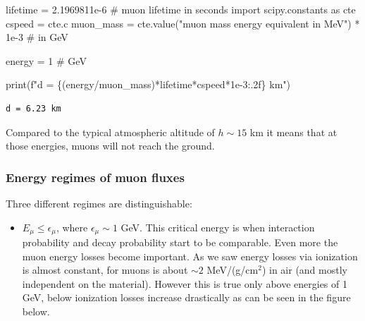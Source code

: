 \documentclass[
  letterpaper,
  DIV=11,
  numbers=noendperiod]{scrreprt}
\newenvironment{Shaded}{\begin{snugshade}}{\end{snugshade}}
\newcommand{\BuiltInTok}[1]{\textcolor[rgb]{0.00,0.23,0.31}{#1}}
\newcommand{\CommentTok}[1]{\textcolor[rgb]{0.37,0.37,0.37}{#1}}
\newcommand{\DecValTok}[1]{\textcolor[rgb]{0.68,0.00,0.00}{#1}}
\newcommand{\FloatTok}[1]{\textcolor[rgb]{0.68,0.00,0.00}{#1}}
\newcommand{\ImportTok}[1]{\textcolor[rgb]{0.00,0.46,0.62}{#1}}
\newcommand{\NormalTok}[1]{\textcolor[rgb]{0.00,0.23,0.31}{#1}}
\newcommand{\OperatorTok}[1]{\textcolor[rgb]{0.37,0.37,0.37}{#1}}
\newcommand{\SpecialCharTok}[1]{\textcolor[rgb]{0.37,0.37,0.37}{#1}}
\newcommand{\SpecialStringTok}[1]{\textcolor[rgb]{0.13,0.47,0.30}{#1}}
\newcommand{\StringTok}[1]{\textcolor[rgb]{0.13,0.47,0.30}{#1}}
\providecommand{\tightlist}{%
  \setlength{\itemsep}{0pt}\setlength{\parskip}{0pt}}\usepackage{longtable,booktabs,array}
\begin{document}
\begin{Shaded}
\begin{Highlighting}[]
\NormalTok{lifetime }\OperatorTok{=} \FloatTok{2.1969811e{-}6} \CommentTok{\# muon lifetime in seconds}
\ImportTok{import}\NormalTok{ scipy.constants }\ImportTok{as}\NormalTok{ cte}
\NormalTok{cspeed }\OperatorTok{=}\NormalTok{ cte.c}
\NormalTok{muon\_mass }\OperatorTok{=}\NormalTok{ cte.value(}\StringTok{"muon mass energy equivalent in MeV"}\NormalTok{) }\OperatorTok{*} \FloatTok{1e{-}3} \CommentTok{\# in GeV}

\NormalTok{energy }\OperatorTok{=} \DecValTok{1} \CommentTok{\# GeV}

\BuiltInTok{print}\NormalTok{(}\SpecialStringTok{f"d = }\SpecialCharTok{\{}\NormalTok{(energy}\OperatorTok{/}\NormalTok{muon\_mass)}\OperatorTok{*}\NormalTok{lifetime}\OperatorTok{*}\NormalTok{cspeed}\OperatorTok{*}\FloatTok{1e{-}3}\SpecialCharTok{:.2f\}}\SpecialStringTok{ km"}\NormalTok{)}
\end{Highlighting}
\end{Shaded}

\begin{verbatim}
d = 6.23 km
\end{verbatim}

Compared to the typical atmospheric altitude of \(h \sim 15\) km it
means that at those energies, muons will not reach the ground.

\subsubsection{Energy regimes of muon
fluxes}\label{energy-regimes-of-muon-fluxes}

Three different regimes are distinguishable:

\begin{itemize}
\tightlist
\item
  \(E_\mu \leq \epsilon_\mu\), where \(\epsilon_\mu \sim 1\) GeV. This
  critical energy is when interaction probability and decay probability
  start to be comparable. Even more the muon energy losses become
  important. As we saw energy losses via ionization is almost constant,
  for muons is about \(\sim 2\) MeV/(g/cm\(^{2}\)) in air (and mostly
  independent on the material). However this is true only above energies
  of 1 GeV, below ionization losses increase drastically as can be seen
  in the figure below.
\end{itemize}
\end{document}
